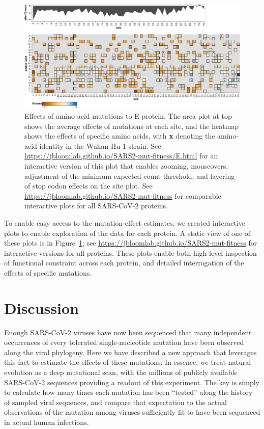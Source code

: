 \documentclass[9pt,twocolumn,twoside]{gsajnl_modified}
\begin{document}
\begin{figure}
\includegraphics[width=\linewidth]{figs/E_heatmap.pdf}
\caption{
Effects of amino-acid mutations to E protein.
The area plot at top shows the average effects of mutations at each site, and the heatmap shows the effects of specific amino acids, with \textbf{x} denoting the amino-acid identity in the Wuhan-Hu-1 strain.
See \url{https://jbloomlab.github.io/SARS2-mut-fitness/E.html} for an interactive version of this plot that enables zooming, mouseovers, adjustment of the minimum expected count threshold, and layering of stop codon effects on the site plot.
See \url{https://jbloomlab.github.io/SARS2-mut-fitness} for comparable interactive plots for all SARS-CoV-2 proteins.
\label{fig:E_heatmap}
}
\end{figure}

To enable easy access to the mutation-effect estimates, we created interactive plots to enable exploration of the data for each protein.
A static view of one of these plots is in Figure~\ref{fig:E_heatmap}; see \url{https://jbloomlab.github.io/SARS2-mut-fitness} for interactive versions for all proteins.
These plots enable both high-level inspection of functional constraint across each protein, and detailed interrogation of the effects of specific mutations.

\section{Discussion}

Enough SARS-CoV-2 viruses have now been sequenced that many independent occurrences of every tolerated single-nucleotide mutation have been observed along the viral phylogeny.
Here we have described a new approach that leverages this fact to estimate the effects of these mutations.
In essence, we treat natural evolution as a deep mutational scan, with the millions of publicly available SARS-CoV-2 sequences providing a readout of this experiment.
The key is simply to calculate how many times each mutation has been ``tested'' along the history of sampled viral sequences, and compare that expectation to the actual observations of the mutation among viruses sufficiently fit to have been sequenced in actual human infections.
\end{document}
